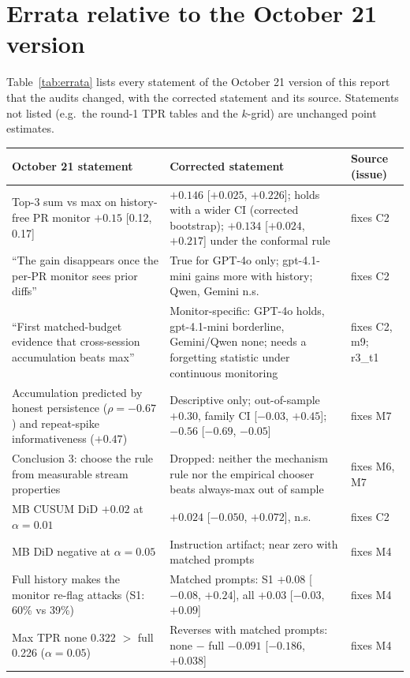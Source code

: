 \documentclass[11pt]{article}
\newcommand{\m}{\ensuremath{-}}
\begin{document}
\section{Errata relative to the October 21 version}
Table~\ref{tab:errata} lists every statement of the October 21 version of this report that the audits changed, with the corrected statement and its source. Statements not listed (e.g.\ the round-1 TPR tables and the $k$-grid) are unchanged point estimates.

\begin{table}[!htbp]\centering\small
\begin{tabularx}{\linewidth}{@{}>{\raggedright\arraybackslash}p{5.2cm}>{\raggedright\arraybackslash}X>{\raggedright\arraybackslash}p{2.7cm}@{}}
\toprule
October 21 statement & Corrected statement & Source (issue)\\
\midrule
Top-3 sum vs max on history-free PR monitor $+0.15$ [0.12, 0.17] & $+0.146$ [$+0.025$, $+0.226$]; holds with a wider CI (corrected bootstrap); $+0.134$ [$+0.024$, $+0.217$] under the conformal rule & fixes C2\\
``The gain disappears once the per-PR monitor sees prior diffs'' & True for GPT-4o only; gpt-4.1-mini gains more with history; Qwen, Gemini n.s. & fixes C2\\
``First matched-budget evidence that cross-session accumulation beats max'' & Monitor-specific: GPT-4o holds, gpt-4.1-mini borderline, Gemini/Qwen none; needs a forgetting statistic under continuous monitoring & fixes C2, m9; r3\_t1\\
Accumulation predicted by honest persistence ($\rho=\m0.67$) and repeat-spike informativeness ($+0.47$) & Descriptive only; out-of-sample $+0.30$, family CI [$\m0.03$, $+0.45$]; $\m0.56$ [$\m0.69$, $\m0.05$] & fixes M7\\
Conclusion 3: choose the rule from measurable stream properties & Dropped: neither the mechanism rule nor the empirical chooser beats always-max out of sample & fixes M6, M7\\
MB CUSUM DiD $+0.02$ at $\alpha=0.01$ & $+0.024$ [$\m0.050$, $+0.072$], n.s. & fixes C2\\
MB DiD negative at $\alpha=0.05$ & Instruction artifact; near zero with matched prompts & fixes M4\\
Full history makes the monitor re-flag attacks (S1: 60\% vs 39\%) & Matched prompts: S1 $+0.08$ [$\m0.08$, $+0.24$], all $+0.03$ [$\m0.03$, $+0.09$] & fixes M4\\
Max TPR none 0.322 $>$ full 0.226 ($\alpha=0.05$) & Reverses with matched prompts: none $-$ full $\m0.091$ [$\m0.186$, $+0.038$] & fixes M4\\

\end{tabularx}
\end{table}
\end{document}
